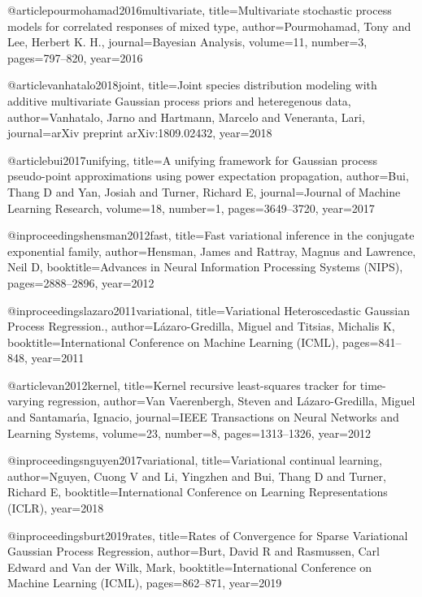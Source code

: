 \documentclass[]{article}
\begin{document}
@article{pourmohamad2016multivariate,
	title={{M}ultivariate stochastic process models for correlated responses of mixed type},
	author={Pourmohamad, Tony and Lee, Herbert K. H.},
	journal={Bayesian Analysis},
	volume={11},
	number={3},
	pages={797--820},
	year={2016}
}

@article{vanhatalo2018joint,
	title={{J}oint species distribution modeling with additive multivariate {G}aussian process priors and heteregenous data},
	author={Vanhatalo, Jarno and Hartmann, Marcelo and Veneranta, Lari},
	journal={arXiv preprint arXiv:1809.02432},
	year={2018}
}

@article{bui2017unifying,
	title={A unifying framework for {G}aussian process pseudo-point approximations using power expectation propagation},
	author={Bui, Thang D and Yan, Josiah and Turner, Richard E},
	journal={Journal of Machine Learning Research},
  	volume={18},
	number={1},
	pages={3649--3720},
	year={2017}
}

@inproceedings{hensman2012fast,
	title={Fast variational inference in the conjugate exponential family},
	author={Hensman, James and Rattray, Magnus and Lawrence, Neil D},
	booktitle={Advances in Neural Information Processing Systems (NIPS)},
	pages={2888--2896},
	year={2012}
}

@inproceedings{lazaro2011variational,
	title={Variational Heteroscedastic {G}aussian Process Regression.},
	author={L{\'a}zaro-Gredilla, Miguel and Titsias, Michalis K},
	booktitle={International Conference on Machine Learning (ICML)},
	pages={841--848},
	year={2011}
}

@article{van2012kernel,
	title={Kernel recursive least-squares tracker for time-varying regression},
	author={Van Vaerenbergh, Steven and L{\'a}zaro-Gredilla, Miguel and Santamar{\'\i}a, Ignacio},
	journal={IEEE Transactions on Neural Networks and Learning Systems},
	volume={23},
	number={8},
	pages={1313--1326},
	year={2012}
}

@inproceedings{nguyen2017variational,
	title={Variational continual learning},
	author={Nguyen, Cuong V and Li, Yingzhen and Bui, Thang D and Turner, Richard E},
	booktitle={International Conference on Learning Representations (ICLR)},
	year={2018}
}

@inproceedings{burt2019rates,
	title={Rates of Convergence for Sparse Variational {G}aussian Process Regression},
	author={Burt, David R and Rasmussen, Carl Edward and Van der Wilk, Mark},
	booktitle={International Conference on Machine Learning (ICML)},
	pages={862--871},
	year={2019}
}
\end{document}
